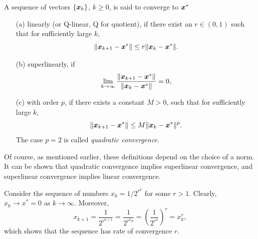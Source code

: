 \begin{definition}
 A sequence of vectors $\{\bm{x}_k\}$, $k\geq 0$, is said to converge to $\bm{x}^*$ 
 \begin{itemize}
 \item[(a)] linearly (or Q-linear, Q for quotient), if there exist an $r\in (0,1)$ such that for sufficiently large $k$,
 \begin{equation*}
  \Vert {\bm{x}_{k+1}-\bm{x}^*}\Vert\leq r\Vert {\bm{x}_k-\bm{x}^*}\Vert.
 \end{equation*}
 \item[(b)] superlinearly, if 
 \begin{equation*}
 \lim_{k\to \infty} \frac{\Vert {\bm{x}_{k+1}-\bm{x}^*}\Vert}{\Vert {\bm{x}_k-\bm{x}^*}\Vert} = 0,
 \end{equation*}
 \item[(c)] with order $p$, if there exists a constant $M>0$, such that for sufficiently large $k$,
 \begin{equation*}
  \Vert {\bm{x}_{k+1}-\bm{x}^*}\Vert\leq M\Vert {\bm{x}_k-\bm{x}^*}\Vert^p.
 \end{equation*}
The case $p=2$ is called {\em quadratic convergence}.
 \end{itemize}
\end{definition}

Of course, as mentioned earlier, these definitions depend on the choice of a norm. It can be shown that quadratic convergence implies superlinear convergence, and superlinear convergence implies linear convergence.

\begin{example}
 Consider the sequence of numbers $x_k = 1/2^{r^k}$ for some $r>1$. Clearly, $x_k\to x^*=0$ as $k\to \infty$. Moreover,
 \begin{equation*}
  x_{k+1}=\frac{1}{2^{r^{k+1}}}=\frac{1}{2^{r^{k}r}}=\left(\frac{1}{2^{r^{k}}}\right)^r=x_k^r,
 \end{equation*}
which shows that the sequence has rate of convergence $r$.
\end{example}

